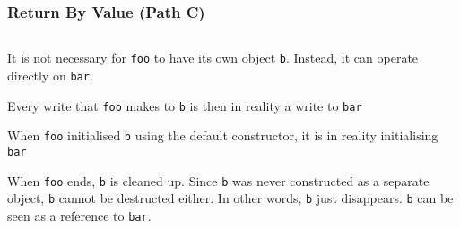 \begin{frame}
  \frametitle{Return By Value (Path C)}
  \begin{center}
    \begin{columns}
      \column{4cm}
      \column{4cm}
    \end{columns}
  \end{center}
  \vskip2mm
  \begin{overprint}
    \begin{center}
      It is not necessary for {\tt foo} to have its own object {\tt b}.
      Instead, it can operate directly on {\tt bar}.
    \end{center}

    \begin{center}
      Every write that {\tt foo} makes to {\tt b}
      is then in reality a write to {\tt bar}
    \end{center}

    \begin{center}
      When {\tt foo} initialised {\tt b} using the default constructor,
      it is in reality initialising {\tt bar}
    \end{center}

    \begin{center}
      When {\tt foo} ends, {\tt b} is cleaned up.
      Since {\tt b} was never constructed as a separate object, {\tt b} cannot be destructed either.
      In other words, {\tt b} just disappears. {\tt b} can be seen as a reference to {\tt bar}.
    \end{center}
  \end{overprint}
\end{frame}

